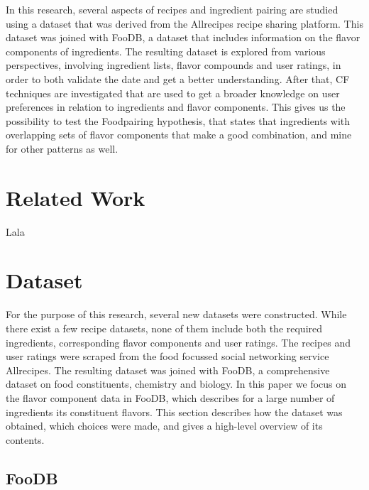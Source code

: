In this research, several aspects of recipes and ingredient pairing are studied using a dataset that was derived from the Allrecipes recipe sharing platform.
This dataset was joined with FooDB, a dataset that includes information on the flavor components of ingredients.
The resulting dataset is explored from various perspectives, involving ingredient lists, flavor compounds and user ratings, in order to both validate the date and get a better understanding.
After that, CF techniques are investigated that are used to get a broader knowledge on user preferences in relation to ingredients and flavor components. 
This gives us the possibility to test the Foodpairing hypothesis, that states that ingredients with overlapping sets of flavor components that make a good combination, and mine for other patterns as well.




\section{Related Work}
\label{sec:related_work}

Lala




\section{Dataset}
\label{sec:dataset}

For the purpose of this research, several new datasets were constructed.
While there exist a few recipe datasets, none of them include both the required ingredients, corresponding flavor components and user ratings.
The recipes and user ratings were scraped from the food focussed social networking service Allrecipes.
The resulting dataset was joined with FooDB, a comprehensive dataset on food constituents, chemistry and biology.
In this paper we focus on the flavor component data in FooDB, which  describes for a large number of ingredients its constituent flavors.
This section describes how the dataset was obtained, which choices were made, and gives a high-level overview of its contents.




\subsection{FooDB}
\label{subsec:foodb}

